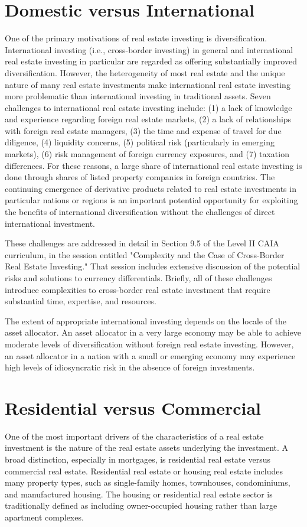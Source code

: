 \documentclass[11pt]{article}
\begin{document}
\section*{Domestic versus International}
One of the primary motivations of real estate investing is diversification. International investing (i.e., cross-border investing) in general and international real estate investing in particular are regarded as offering substantially improved diversification. However, the heterogeneity of most real estate and the unique nature of many real estate investments make international real estate investing more problematic than international investing in traditional assets. Seven challenges to international real estate investing include: (1) a lack of knowledge and experience regarding foreign real estate markets, (2) a lack of relationships with foreign real estate managers, (3) the time and expense of travel for due diligence, (4) liquidity concerns, (5) political risk (particularly in emerging markets), (6) risk management of foreign currency exposures, and (7) taxation differences. For these reasons, a large share of international real estate investing is done through shares of listed property companies in foreign countries. The continuing emergence of derivative products related to real estate investments in particular nations or regions is an important potential opportunity for exploiting the benefits of international diversification without the challenges of direct international investment.

These challenges are addressed in detail in Section 9.5 of the Level II CAIA curriculum, in the session entitled "Complexity and the Case of Cross-Border Real Estate Investing." That session includes extensive discussion of the potential risks and solutions to currency differentials. Briefly, all of these challenges introduce complexities to cross-border real estate investment that require substantial time, expertise, and resources.

The extent of appropriate international investing depends on the locale of the asset allocator. An asset allocator in a very large economy may be able to achieve moderate levels of diversification without foreign real estate investing. However, an asset allocator in a nation with a small or emerging economy may experience high levels of idiosyncratic risk in the absence of foreign investments.

\section*{Residential versus Commercial}
One of the most important drivers of the characteristics of a real estate investment is the nature of the real estate assets underlying the investment. A broad distinction, especially in mortgages, is residential real estate versus commercial real estate. Residential real estate or housing real estate includes many property types, such as single-family homes, townhouses, condominiums, and manufactured housing. The housing or residential real estate sector is traditionally defined as including owner-occupied housing rather than large apartment complexes.
\end{document}
